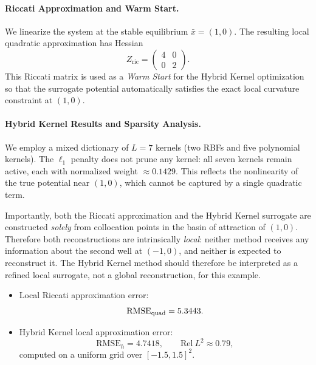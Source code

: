\documentclass[11pt]{article}
\theoremstyle{plain}      %
\theoremstyle{definition} %
\begin{document}
\paragraph{Riccati Approximation and Warm Start.}
We linearize the system at the stable equilibrium $\bar{x}=(1,0)$.
The resulting local quadratic approximation has Hessian
\[
Z_{\text{ric}}
=
\begin{pmatrix} 4 & 0 \\ 0 & 2 \end{pmatrix}.
\]
This Riccati matrix is used as a \emph{Warm Start} for the Hybrid Kernel
optimization so that the surrogate potential automatically satisfies the exact
local curvature constraint at $(1,0)$.

\paragraph{Hybrid Kernel Results and Sparsity Analysis.}
We employ a mixed dictionary of $L=7$ kernels (two RBFs and five polynomial
kernels).  
The $\ell_1$ penalty does not prune any kernel: all seven kernels remain active,
each with normalized weight $\approx 0.1429$. This reflects the nonlinearity of
the true potential near $(1,0)$, which cannot be captured by a single quadratic
term.

Importantly, both the Riccati approximation and the Hybrid Kernel surrogate are
constructed \emph{solely} from collocation points in the basin of attraction of
$(1,0)$. Therefore both reconstructions are intrinsically \emph{local}:
neither method receives any information about the second well at $(-1,0)$, and
neither is expected to reconstruct it. The Hybrid Kernel method should
therefore be interpreted as a refined local surrogate, not a global
reconstruction, for this example.

\begin{itemize}
    \item Local Riccati approximation error:
    \[
      \mathrm{RMSE}_{\rm quad}=5.3443.
    \]
    \item Hybrid Kernel local approximation error:
    \[
      \mathrm{RMSE}_{h}=4.7418,
      \qquad
      \mathrm{Rel\ }L^2 \approx 0.79,
    \]
    computed on a uniform grid over $[-1.5,1.5]^2$.
\end{itemize}
\end{document}
